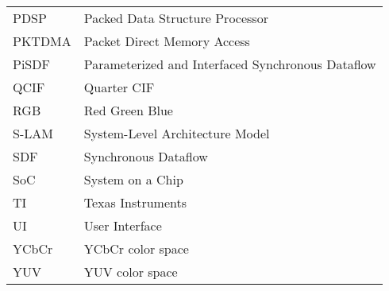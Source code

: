 \begin{longtable}{@{}p{}p{}@{}}
    PDSP & Packed Data Structure Processor \\
    PKTDMA & Packet Direct Memory Access \\
    PiSDF & Parameterized and Interfaced Synchronous Dataflow \\
    QCIF & Quarter CIF \\
    RGB & Red Green Blue \\
    S-LAM & System-Level Architecture Model \\
    SDF & Synchronous Dataflow \\
    SoC & System on a Chip \\
    TI & Texas Instruments \\
    UI & User Interface \\
    YCbCr & YCbCr color space \\
    YUV & YUV color space \\
\end{longtable}
